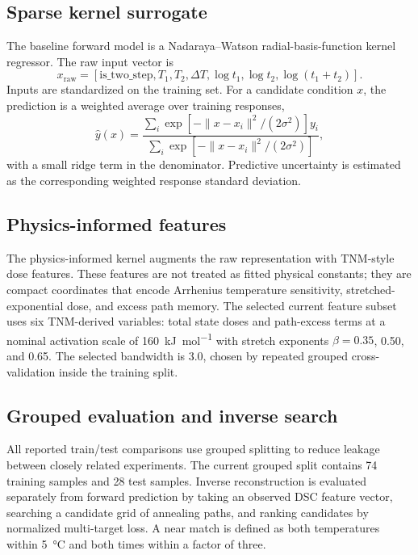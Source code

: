 \documentclass[11pt]{article}
\newcommand{\Tone}{\ensuremath{T_{1}}}
\newcommand{\ToneTime}{\ensuremath{t_{1}}}
\newcommand{\Ttwo}{\ensuremath{T_{2}}}
\newcommand{\TtwoTime}{\ensuremath{t_{2}}}
\begin{document}
\subsection{Sparse kernel surrogate}
The baseline forward model is a Nadaraya--Watson radial-basis-function kernel regressor. The raw input vector is
\begin{equation}
  x_{\mathrm{raw}} =
  [\mathrm{is\_two\_step},\Tone,\Ttwo,\Delta T,
  \log \ToneTime,\log \TtwoTime,\log(\ToneTime+\TtwoTime)].
\end{equation}
Inputs are standardized on the training set. For a candidate condition $x$, the prediction is a weighted average over training responses,
\begin{equation}
  \hat{y}(x) =
  \frac{\sum_i \exp[-\lVert x-x_i\rVert^2/(2\sigma^2)] y_i}
       {\sum_i \exp[-\lVert x-x_i\rVert^2/(2\sigma^2)]},
\end{equation}
with a small ridge term in the denominator. Predictive uncertainty is estimated as the corresponding weighted response standard deviation.

\subsection{Physics-informed features}
The physics-informed kernel augments the raw representation with TNM-style dose features. These features are not treated as fitted physical constants; they are compact coordinates that encode Arrhenius temperature sensitivity, stretched-exponential dose, and excess path memory. The selected current feature subset uses six TNM-derived variables: total state doses and path-excess terms at a nominal activation scale of \SI{160}{kJ\per mol} with stretch exponents $\beta=0.35$, 0.50, and 0.65. The selected bandwidth is 3.0, chosen by repeated grouped cross-validation inside the training split.

\subsection{Grouped evaluation and inverse search}
All reported train/test comparisons use grouped splitting to reduce leakage between closely related experiments. The current grouped split contains 74 training samples and 28 test samples. Inverse reconstruction is evaluated separately from forward prediction by taking an observed DSC feature vector, searching a candidate grid of annealing paths, and ranking candidates by normalized multi-target loss. A near match is defined as both temperatures within \SI{5}{\celsius} and both times within a factor of three.
\end{document}

